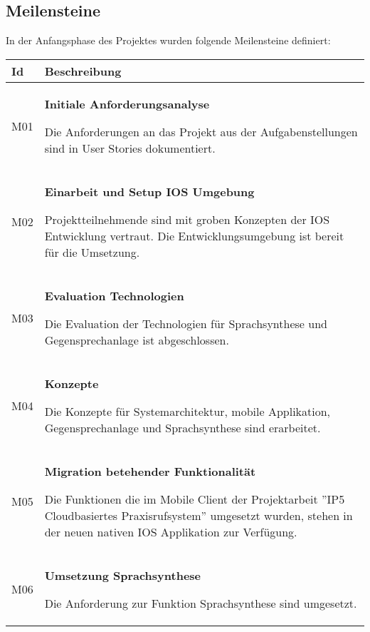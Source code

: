 \subsection{Meilensteine}

In der Anfangsphase des Projektes wurden folgende Meilensteine definiert:

\begin{table}[h]
    \centering
    \begin{tabular}{|l|p{15cm}|}
        \hline
        \textbf{Id} & \textbf{Beschreibung}                                                                                                                                                                                         \\
        \hline

        M01         & \textbf{Initiale Anforderungsanalyse}

        Die Anforderungen an das Projekt aus der Aufgabenstellungen sind in User Stories dokumentiert.\\
        \hline

        M02         & \textbf{Einarbeit und Setup IOS Umgebung}

        Projektteilnehmende sind mit groben Konzepten der IOS Entwicklung vertraut.
        Die Entwicklungsumgebung ist bereit für die Umsetzung. \\
        \hline

        M03         & \textbf{Evaluation Technologien}

        Die Evaluation der Technologien für Sprachsynthese und Gegensprechanlage ist abgeschlossen. \\
        \hline

        M04         & \textbf{Konzepte}

        Die Konzepte für Systemarchitektur, mobile Applikation, Gegensprechanlage und Sprachsynthese sind erarbeitet. \\
        \hline

        M05         & \textbf{Migration betehender Funktionalität}

        Die Funktionen die im Mobile Client der Projektarbeit ''IP5 Cloudbasiertes Praxisrufsystem'' umgesetzt wurden, stehen in der neuen nativen IOS Applikation zur Verfügung. \\
        \hline

        M06         & \textbf{Umsetzung Sprachsynthese}

        Die Anforderung zur Funktion Sprachsynthese sind umgesetzt. \\
        \hline


\end{tabular}
\end{table}
